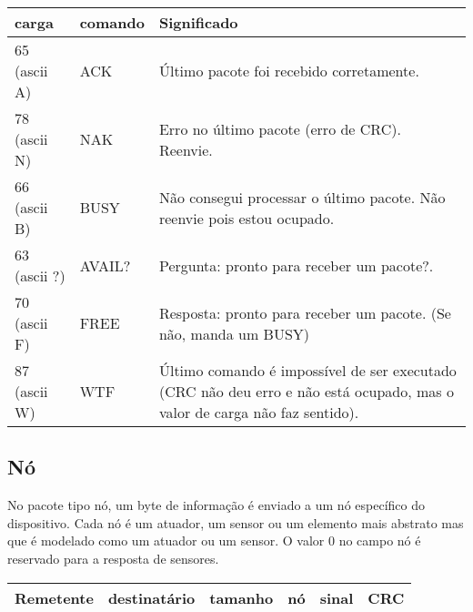 \documentclass[11pt,	 papera4]{article}
\begin{document}
\begin{center}
\begin{tabular}{lll}
 carga         &  comando  &  Significado                                                                                                                \\
\hline
 65 (ascii A)  &  ACK      &  Último pacote foi recebido corretamente.                                                                                   \\
 78 (ascii N)  &  NAK      &  Erro no último pacote (erro de CRC). Reenvie.                                                                              \\
 66 (ascii B)  &  BUSY     &  Não consegui processar o último pacote. Não reenvie pois estou ocupado.                                                    \\
 63 (ascii ?)  &  AVAIL?   &  Pergunta: pronto para receber um pacote?.                                                                                  \\
 70 (ascii F)  &  FREE     &  Resposta: pronto para receber um pacote. (Se não, manda um BUSY)                                                           \\
 87 (ascii W)  &  WTF      &  Último comando é impossível de ser executado (CRC não deu erro e não está ocupado, mas o valor de carga não faz sentido).  \\
\hline
\end{tabular}
\end{center}



\subsection{Nó}
\label{sec-1.2}


No pacote tipo nó, um byte de informação é enviado a um nó específico do dispositivo. Cada nó é um atuador, um sensor ou um elemento mais abstrato mas que é modelado como um atuador ou um sensor. O valor 0 no campo nó é reservado para a resposta de sensores.


\begin{center}
\begin{tabular}{llllll}
\hline
 Remetente  &  destinatário  &  tamanho  &  nó  &  sinal  &  CRC  \\
\hline
\end{tabular}
\end{center}
\end{document}

